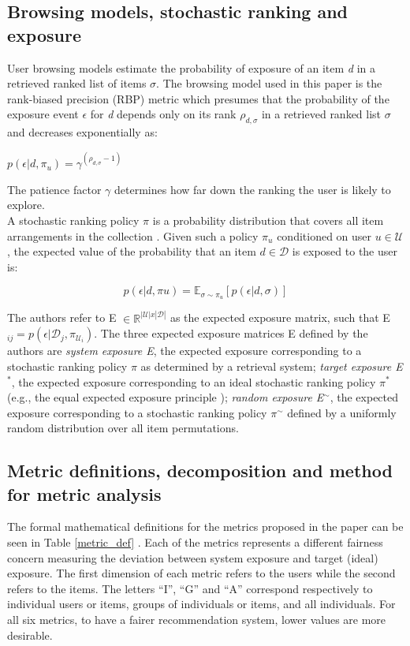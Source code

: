 \subsection{Browsing models, stochastic ranking and exposure}
\label{sec:model_description}
User browsing models estimate the probability of exposure of an item \textit{d} in a retrieved ranked list of items \textit{$\sigma$}. The browsing model used in this paper is the rank-biased precision (RBP) metric \cite{Moffat2008} which presumes that the probability of the exposure event \textit{$\epsilon$} for \textit{d} depends only on its rank $\rho_{d, \sigma}$ in a retrieved ranked list \textit{$\sigma$} and decreases exponentially as:
\begin{center}
    $p(\epsilon|d, \pi_{u}) = \gamma^{(\rho_{d, \sigma}-1)}$
\end{center}
The patience factor $\gamma$ determines how far down the ranking the user is likely to explore. \\
 
A stochastic ranking policy $\pi$ is a probability distribution that covers all item arrangements in the collection \cite{DBLP:Diaz}. Given such a policy $\pi_u$ conditioned on user $ u\in \mathcal{U}$, the expected value of the probability that an item $d\in \mathcal{D}$ is exposed to the user is:

\begin{center}
   \begin{equation}\label{eq1}
       p(\epsilon|d, \pi{u}) = \mathbb{E}_{\sigma \sim \pi_u}[p(\epsilon|d, \sigma)]
   \end{equation} 
\end{center}
The authors refer to E $\in \mathbb{R}^{|\mathcal{U}|x|\mathcal{D}|}$ as the expected exposure matrix, such that E$_{ij} = p(\epsilon|\mathcal{D}_{j}, \pi_{\mathcal{U}_{i}})$. The three expected exposure matrices E defined by the authors are \textit{system exposure  E}, the expected exposure corresponding to a stochastic ranking policy $\pi$ as determined by a retrieval system; \textit{target exposure E$^*$}, the expected exposure corresponding to an ideal stochastic ranking policy $\pi^*$ (e.g., the equal expected exposure principle \cite{DBLP:Diaz} ); \textit{random exposure E$^\sim$}, the expected exposure corresponding to a stochastic ranking policy $\pi^\sim$ defined by a uniformly random distribution over all item permutations.

\subsection{Metric definitions, decomposition and method for metric analysis}
\label{sec:metrics}
The formal mathematical definitions for the metrics proposed in the paper can be seen in Table \ref{metric_def} \cite{wu}. Each of the metrics represents a different fairness concern measuring the deviation between system exposure and target (ideal) exposure. The first dimension of each metric refers to the users while the second refers to the items. The letters ``I'', ``G'' and ``A'' correspond respectively to individual users or items, groups of individuals or items, and all individuals. For all six metrics, to have a fairer recommendation system, lower values are more desirable. 

